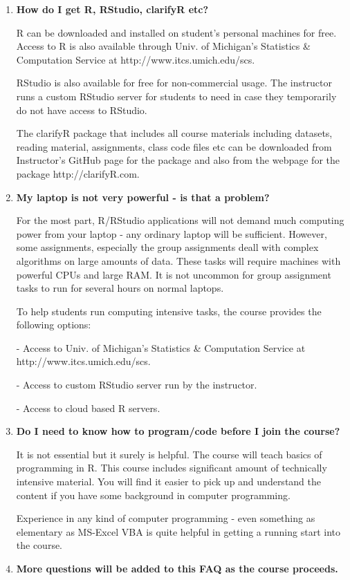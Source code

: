 \documentclass[11pt, letterpaper, twoside]{memoir}\usepackage{knitr}
\begin{document}
\begin{enumerate}

\item \textbf{How do I get R, RStudio, clarifyR etc?}

R can be downloaded and installed on student's personal machines for free. Access to R is also available through Univ. of Michigan's Statistics \& Computation Service at http://www.itcs.umich.edu/scs. 

RStudio is also available for free for non-commercial usage. The instructor runs a custom RStudio server for students to need in case they temporarily do not have access to RStudio.

The clarifyR package that includes all course materials including datasets, reading material, assignments, class code files etc can be downloaded from Instructor's GitHub page for the package and also from the webpage for the package http://clarifyR.com. 


\item \textbf{My laptop is not very powerful - is that a problem?}

For the most part, R/RStudio applications will not demand much computing power from your laptop - any ordinary laptop will be sufficient. However, some assignments, especially the group assignments deall with complex algorithms on large amounts of data. These tasks will require machines with powerful CPUs and large RAM. It is not uncommon for group assignment tasks to run for several hours on normal laptops.

To help students run computing intensive tasks, the course provides the following options:

- Access to Univ. of Michigan's Statistics \& Computation Service at http://www.itcs.umich.edu/scs.

- Access to custom RStudio server run by the instructor.

- Access to cloud based R servers.

\item \textbf{Do I need to know how to program/code before I join the course?}

It is not essential but it surely is helpful. The course will teach basics of programming in R. This course includes significant amount of technically intensive material. You will find it easier to pick up and understand the content if you have some background in computer programming. 

Experience in any kind of computer programming - even something as elementary as MS-Excel VBA is quite helpful in getting a running start into the course.

\item \textbf{More questions will be added to this FAQ as the course proceeds.}
\end{enumerate}
\end{document}
